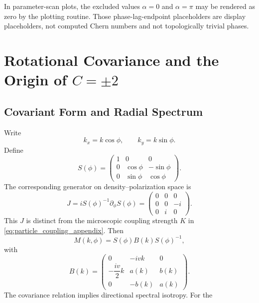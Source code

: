 \documentclass[11pt]{article}
\numberwithin{equation}{section}
\begin{document}
In parameter-scan plots, the excluded values $\alpha=0$ and $\alpha=\pi$
may be rendered as zero by the plotting routine. Those phase-lag-endpoint placeholders are
display placeholders, not computed Chern numbers and not topologically
trivial phases.

\section{Rotational Covariance and the Origin of \texorpdfstring{$C=\pm2$}{C = +/-2}}

\subsection{Covariant Form and Radial Spectrum}

Write
\begin{equation}
  k_x=k\cos\phi,\qquad k_y=k\sin\phi.
\end{equation}
Define
\begin{equation}
  S(\phi)=
  \begin{pmatrix}
  1&0&0\\
  0&\cos\phi&-\sin\phi\\
  0&\sin\phi&\cos\phi
  \end{pmatrix}.
\end{equation}
The corresponding generator on density--polarization space is
\begin{equation}
  J=iS(\phi)^{-1}\partial_\phi S(\phi)=
  \begin{pmatrix}
  0&0&0\\
  0&0&-i\\
  0&i&0
  \end{pmatrix}.
  \label{eq:angular_generator}
\end{equation}
This $J$ is distinct from the microscopic coupling strength $K$ in
\eqref{eq:particle_coupling_appendix}.
Then
\begin{equation}
  M(k,\phi)=S(\phi)B(k)S(\phi)^{-1},
  \label{eq:rotational_covariance}
\end{equation}
with
\begin{equation}
  B(k)=
  \begin{pmatrix}
  0&-ivk&0\\[4pt]
  -\dfrac{iv}{2}k&a(k)&b(k)\\[4pt]
  0&-b(k)&a(k)
  \end{pmatrix}.
  \label{eq:radial_matrix}
\end{equation}
The covariance relation implies directional spectral isotropy. For the
\end{document}
